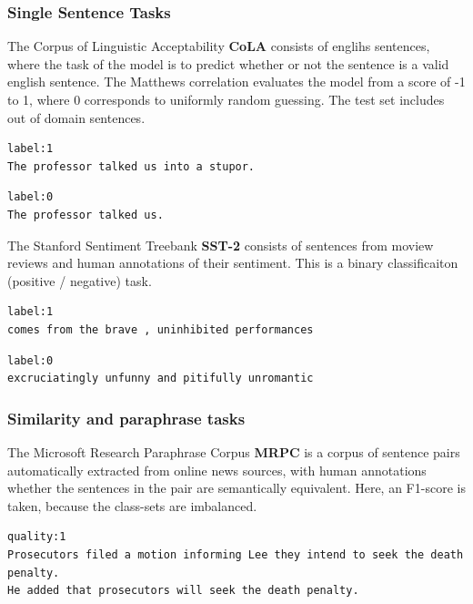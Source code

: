 \documentclass[a4paper,12pt,twoside,openright]{report}
\begin{document}
\subsubsection{Single Sentence Tasks}

The Corpus of Linguistic Acceptability \textbf{CoLA} consists of englihs sentences, where the task of the model is to predict whether or not the sentence is a valid english sentence.
The Matthews correlation evaluates the model from a score of -1 to 1, where 0 corresponds to uniformly random guessing.
The test set includes out of domain sentences.

\begin{verbatim}
label:1
The professor talked us into a stupor.
\end{verbatim}

\begin{verbatim}
label:0	
The professor talked us.
\end{verbatim}


The Stanford Sentiment Treebank \textbf{SST-2} consists of sentences from moview reviews and human annotations of their sentiment.
This is a binary classificaiton (positive / negative) task.


\begin{verbatim}
label:1
comes from the brave , uninhibited performances
\end{verbatim}

\begin{verbatim}
label:0
excruciatingly unfunny and pitifully unromantic
\end{verbatim}

\subsubsection{Similarity and paraphrase tasks}

The Microsoft Research Paraphrase Corpus \textbf{MRPC} is a corpus of sentence pairs automatically extracted from online news sources, with human annotations whether the sentences in the pair are semantically equivalent.
Here, an F1-score is taken, because the class-sets are imbalanced.


\begin{verbatim}
quality:1	
Prosecutors filed a motion informing Lee they intend to seek the death penalty.	
He added that prosecutors will seek the death penalty.
\end{verbatim}
\end{document}
